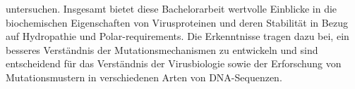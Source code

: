 \documentclass[german,version-2022-01]{uzl-thesis}
\begin{document}
untersuchen. Insgesamt bietet diese Bachelorarbeit wertvolle Einblicke in die biochemischen Eigenschaften von Virusproteinen und deren Stabilit\"at in Bezug auf Hydropathie und Polar-requirements. Die Erkenntnisse tragen dazu bei, ein besseres Verst\"andnis der Mutationsmechanismen zu entwickeln und sind entscheidend f\"ur das Verst\"andnis der Virusbiologie sowie der Erforschung von Mutationsmustern in verschiedenen Arten von DNA-Sequenzen.




%
\end{document}
